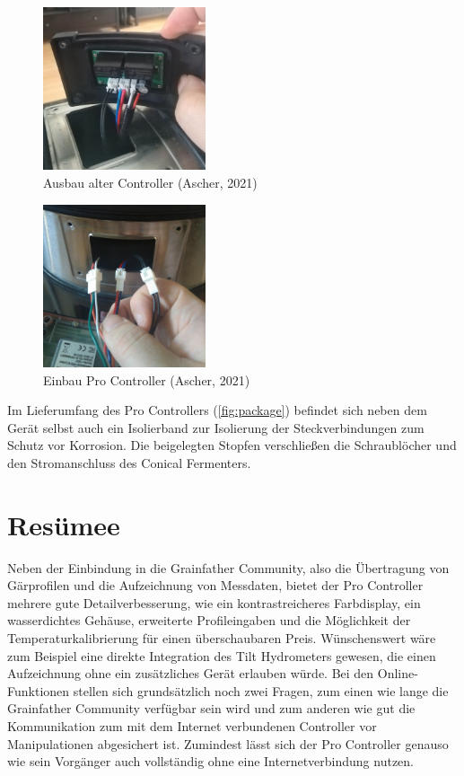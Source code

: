 \documentclass[a4paper,parskip=half]{scrartcl}
\begin{document}
\begin{figure}[H]
\centering
\includegraphics[width=4.8cm]{images/gfpc_install_old.jpg}
\caption{Ausbau alter Controller (Ascher, 2021)}
\label{fig:installold}
\end{figure}

\begin{figure}[H]
\centering
\includegraphics[width=4.8cm]{images/gfpc_install_new.jpg}
\caption{Einbau Pro Controller (Ascher, 2021)}
\label{fig:installnew}
\end{figure}

Im Lieferumfang des Pro Controllers (\autoref{fig:package})
befindet sich neben dem Gerät selbst auch ein Isolierband
zur Isolierung der Steckverbindungen zum Schutz vor
Korrosion. Die beigelegten Stopfen verschließen die
Schraublöcher und den Stromanschluss des Conical Fermenters.

\section*{Resümee}

Neben der Einbindung in die Grainfather Community, also die
Übertragung von Gärprofilen und die Aufzeichnung von
Messdaten, bietet der Pro Controller mehrere gute
Detailverbesserung, wie ein kontrastreicheres Farbdisplay,
ein wasserdichtes Gehäuse, erweiterte Profileingaben und
die Möglichkeit der Temperaturkalibrierung für einen
überschaubaren Preis. Wünschenswert wäre zum Beispiel
eine direkte Integration des Tilt Hydrometers
gewesen, die einen Aufzeichnung ohne ein zusätzliches
Gerät erlauben würde. Bei den Online-Funktionen stellen sich
grundsätzlich noch zwei Fragen, zum einen wie lange die
Grainfather Community verfügbar sein wird und zum anderen wie
gut die Kommunikation zum mit dem Internet verbundenen Controller
vor Manipulationen abgesichert ist. Zumindest lässt sich der Pro
Controller genauso wie sein Vorgänger auch vollständig ohne eine
Internetverbindung nutzen.
\end{document}
